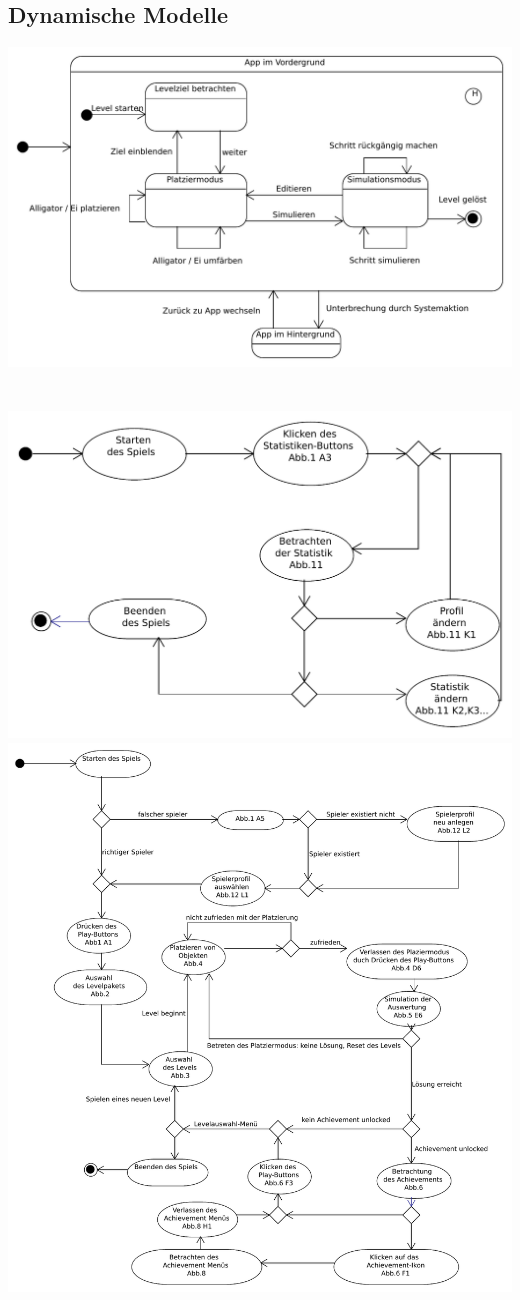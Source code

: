 \subsection{Dynamische Modelle}
\includegraphics[scale=0.6]{Systemmodelle/game_state.pdf}
\\
\\
\\
\includegraphics[scale=0.6]{Systemmodelle/parent_activity.pdf}
\clearpage
\includegraphics[scale=0.6]{Systemmodelle/start_activity.pdf}
